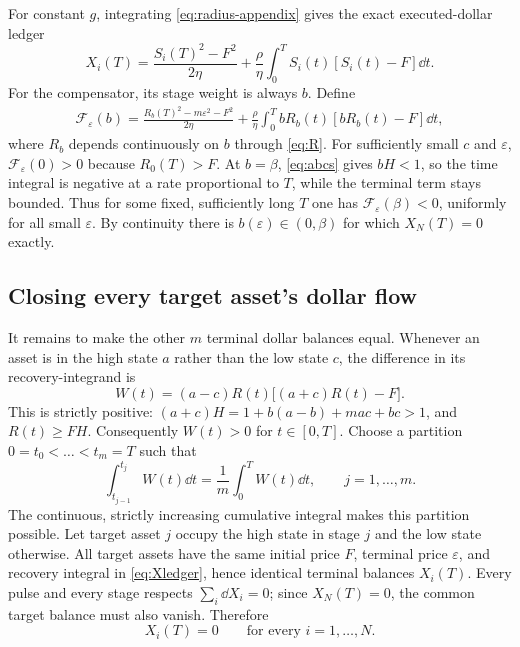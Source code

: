 \documentclass[review,hidelinks,onefignum,onetabnum]{siamonline250211}
\begin{document}
For constant $g$, integrating \eqref{eq:radius-appendix} gives the exact executed-dollar ledger
\begin{equation}\label{eq:Xledger}
X_i(T)=\frac{S_i(T)^2-F^2}{2\eta}
+\frac\rho\eta\int_0^T S_i(t)[S_i(t)-F]\dd t.
\end{equation}
For the compensator, its stage weight is always $b$. Define
\begin{align}\label{eq:compensator}
\mathcal F_\varepsilon(b)=\frac{R_b(T)^2-m\varepsilon^2-F^2}{2\eta}
+\frac\rho\eta\int_0^T bR_b(t)[bR_b(t)-F]\dd t,
\end{align}
where $R_b$ depends continuously on $b$ through \eqref{eq:R}. For sufficiently small $c$ and $\varepsilon$, $\mathcal F_\varepsilon(0)>0$ because $R_0(T)>F$. At $b=\beta$, \eqref{eq:abcs} gives $bH<1$, so the time integral is negative at a rate proportional to $T$, while the terminal term stays bounded. Thus for some fixed, sufficiently long $T$ one has $\mathcal F_\varepsilon(\beta)<0$, uniformly for all small $\varepsilon$. By continuity there is $b(\varepsilon)\in(0,\beta)$ for which $X_N(T)=0$ exactly.

\subsection{Closing every target asset's dollar flow}
It remains to make the other $m$ terminal dollar balances equal. Whenever an asset is in the high state $a$ rather than the low state $c$, the difference in its recovery-integrand is
\begin{equation}\label{eq:W}
W(t)=(a-c)R(t)\big[(a+c)R(t)-F\big].
\end{equation}
This is strictly positive: $(a+c)H=1+b(a-b)+mac+bc>1$, and $R(t)\ge FH$. Consequently $W(t)>0$ for $t\in[0,T]$. Choose a partition $0=t_0<\dots<t_m=T$ such that
\begin{equation}\label{eq:weights}
\int_{t_{j-1}}^{t_j}W(t)\dd t=\frac1m\int_0^T W(t)\dd t,
\qquad j=1,\ldots,m.
\end{equation}
The continuous, strictly increasing cumulative integral makes this partition possible. Let target asset $j$ occupy the high state in stage $j$ and the low state otherwise. All target assets have the same initial price $F$, terminal price $\varepsilon$, and recovery integral in \eqref{eq:Xledger}, hence identical terminal balances $X_i(T)$. Every pulse and every stage respects $\sum_i\dd X_i=0$; since $X_N(T)=0$, the common target balance must also vanish. Therefore
\begin{equation}\label{eq:allclosed}
X_i(T)=0\qquad\text{for every } i=1,\ldots,N.
\end{equation}
\end{document}
